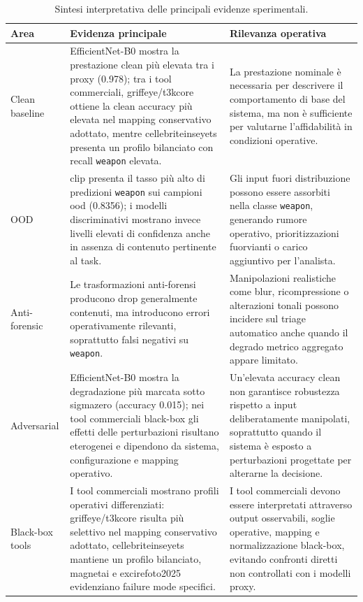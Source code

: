 \begin{table}[H]
\centering
\caption{Sintesi interpretativa delle principali evidenze sperimentali.}
\label{tab:conclusions-main-findings}
\footnotesize
\renewcommand{\arraystretch}{1.2}
\begin{tabularx}{\textwidth}{@{}p{} X X@{}}
\toprule
\textbf{Area} & \textbf{Evidenza principale} & \textbf{Rilevanza operativa} \\
\midrule
Clean baseline
& EfficientNet-B0 mostra la prestazione clean più elevata tra i proxy
  (0.978); tra i tool commerciali, \gls{griffeye}/\gls{t3kcore} ottiene la
  clean accuracy più elevata nel mapping conservativo adottato, mentre
  \gls{cellebriteinseyets} presenta un profilo bilanciato con recall
  \texttt{weapon} elevata.
& La prestazione nominale è necessaria per descrivere il comportamento di base
  del sistema, ma non è sufficiente per valutarne l'affidabilità in condizioni
  operative. \\

OOD
& \gls{clip} presenta il tasso più alto di predizioni \texttt{weapon} sui
  campioni \gls{ood} (0.8356); i modelli discriminativi mostrano invece livelli
  elevati di confidenza anche in assenza di contenuto pertinente al task.
& Gli input fuori distribuzione possono essere assorbiti nella classe
  \texttt{weapon}, generando rumore operativo, prioritizzazioni fuorvianti o
  carico aggiuntivo per l'analista. \\

Anti-forensic
& Le trasformazioni anti-forensi producono drop generalmente contenuti, ma
  introducono errori operativamente rilevanti, soprattutto falsi negativi su
  \texttt{weapon}.
& Manipolazioni realistiche come blur, ricompressione o alterazioni tonali
  possono incidere sul triage automatico anche quando il degrado metrico
  aggregato appare limitato. \\

Adversarial
& EfficientNet-B0 mostra la degradazione più marcata sotto \gls{sigmazero}
  (accuracy 0.015); nei tool commerciali black-box gli effetti delle
  perturbazioni risultano eterogenei e dipendono da sistema, configurazione e
  mapping operativo.
& Un'elevata accuracy clean non garantisce robustezza rispetto a input
  deliberatamente manipolati, soprattutto quando il sistema è esposto a
  perturbazioni progettate per alterarne la decisione. \\

Black-box tools
& I tool commerciali mostrano profili operativi differenziati:
  \gls{griffeye}/\gls{t3kcore} risulta più selettivo nel mapping conservativo
  adottato, \gls{cellebriteinseyets} mantiene un profilo bilanciato,
  \gls{magnetai} e \gls{excirefoto2025} evidenziano failure mode specifici.
& I tool commerciali devono essere interpretati attraverso output osservabili,
  soglie operative, mapping e normalizzazione black-box, evitando confronti
  diretti non controllati con i modelli proxy. \\


\end{tabularx}
\end{table}
